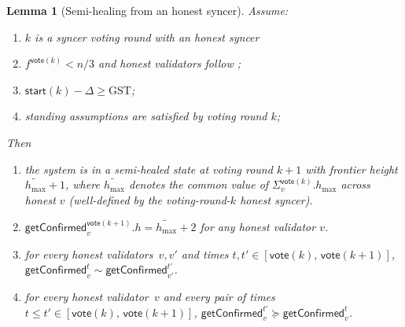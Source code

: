 \ifx\litemode\undefined\documentclass{article}\fi
\newcommand{\hmax}{\ensuremath{h_{\max}}\xspace}
\newcommand{\start}{\ensuremath{\mathsf{start}}}
\newcommand{\vote}{\ensuremath{\mathsf{vote}}}
\newcommand{\GST}{\ensuremath{\mathrm{GST}}\xspace}
\newcommand{\comm}[1]{\ensuremath{\widetilde{#1}}}
\newcommand{\getConfirmed}{\textsf{getConfirmed}\xspace}
\theoremstyle{plain}
\newtheorem{lemma}{Lemma}
\theoremstyle{definition}
\theoremstyle{remark}
\begin{document}
\begin{lemma}[Semi-healing from an honest syncer]\label{lem:semi-healing-from-syncer}
Assume:
\begin{enumerate}
  \item $k$ is a syncer voting round with an honest syncer
  \item $f^{\vote(k)} < n/3$ and honest validators follow ;
  \item $\start(k) - \Delta \geq \GST$;
  \item standing assumptions are satisfied by voting round $k$;
\end{enumerate}
Then
\begin{enumerate}
  \item the system is in a semi-healed state at voting round $k+1$ with frontier height $\comm{\hmax}+1$, where $\comm{\hmax}$ denotes the common value of $\Sigma_v^{\vote(k)}.\hmax$ across honest $v$ (well-defined by the voting-round-$k$ honest syncer).
  \item $\getConfirmed_v^{\vote(k+1)}.h = \comm{\hmax}+2$ for any honest validator $v$.
  \item for every honest validators~$v, v'$ and times $t, t' \in [\vote(k),\, \vote(k+1)]$, $\getConfirmed_v^{t} \sim \getConfirmed_{v'}^{t'}$.
  \item for every honest validator~$v$ and every pair of times $t \leq t' \in [\vote(k),\, \vote(k+1)]$, $\getConfirmed_v^{t'} \succeq \getConfirmed_v^{t}$.
\end{enumerate}
\end{lemma}
\end{document}
